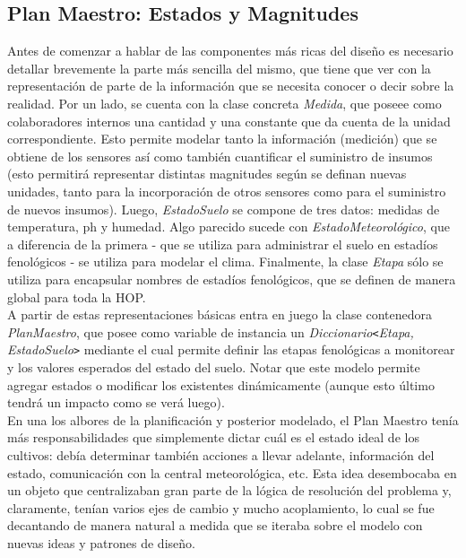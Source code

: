 \subsection{Plan Maestro: Estados y Magnitudes}

Antes de comenzar a hablar de las componentes más ricas del diseño es necesario detallar brevemente la parte más sencilla del mismo, que tiene que ver con la representación de parte de la información que se necesita conocer o decir sobre la realidad. Por un lado, se cuenta con la clase concreta \textsl{Medida}, que poseee como colaboradores internos una cantidad y una constante que da cuenta de la unidad correspondiente. Esto permite modelar tanto la información (medición) que se obtiene de los sensores así como también cuantificar el suministro de insumos (esto permitirá representar distintas magnitudes según se definan nuevas unidades, tanto para la incorporación de otros sensores como para el suministro de nuevos insumos). Luego, \textsl{EstadoSuelo} se compone de tres datos: medidas de temperatura, ph y humedad. Algo parecido sucede con \textsl{EstadoMeteorológico}, que a diferencia de la primera - que se utiliza para administrar el suelo en estadíos fenológicos - se utiliza para modelar el clima. Finalmente, la clase \textsl{Etapa} sólo se utiliza para encapsular nombres de estadíos fenológicos, que se definen de manera global para toda la HOP.\\
\indent A partir de estas representaciones básicas entra en juego la clase contenedora \textsl{PlanMaestro}, que posee como variable de instancia un \textsl{Diccionario}\verb|<|\textsl{Etapa, EstadoSuelo}\verb|>| mediante el cual permite definir las etapas fenológicas a monitorear y los valores esperados del estado del suelo. Notar que este modelo permite agregar estados o modificar los existentes dinámicamente (aunque esto último tendrá un impacto como se verá luego).\\
\indent En una los albores de la planificación y posterior modelado, el Plan Maestro tenía más responsabilidades que simplemente dictar cuál es el estado ideal de los cultivos: debía determinar también acciones a llevar adelante, información del estado, comunicación con la central meteorológica, etc. Esta idea desembocaba en un objeto que centralizaban gran parte de la lógica de resolución del problema y, claramente, tenían varios ejes de cambio y mucho acoplamiento, lo cual se fue decantando de manera natural a medida que se iteraba sobre el modelo con nuevas ideas y patrones de diseño.

